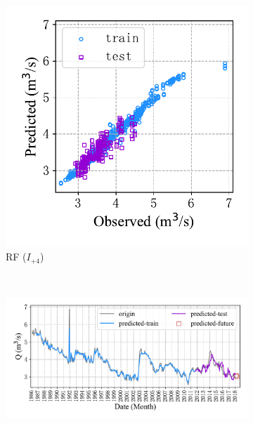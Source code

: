 \begin{figure}[!htbp]
\begin{subfigure}[b]{0.615\textwidth}
    \label{fig:spr_series_in_3_out_3_lstm}
  \end{subfigure}
  \\
  \begin{subfigure}[b]{0.305\textwidth}
    \includegraphics[width=\textwidth]{Img/chap4_spr/out3/spr_scatter_in_4_out_3_rf.pdf}
    \vspace{-1.2cm}
    \caption{RF ($I_{+4}$)}
    \label{fig:spr_scatter_in_4_out_3_rf}
  \end{subfigure}
  ~
  \begin{subfigure}[b]{0.615\textwidth}
    \includegraphics[width=\textwidth]{Img/chap4_spr/out3/spr_series_in_4_out_3_rf.pdf}
    \vspace{-1.2cm}

\end{subfigure}
\end{figure}
